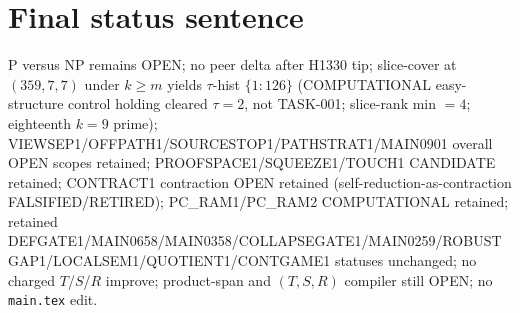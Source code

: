 \documentclass[11pt]{article}
\begin{document}
\section*{Final status sentence}
P versus NP remains OPEN; no peer delta after H1330 tip; slice-cover at $(359,7,7)$ under $k{\ge}m$ yields $\tau$-hist $\{1{:}126\}$ (COMPUTATIONAL easy-structure control holding cleared $\tau{=}2$, not TASK-001; slice-rank min $=4$; eighteenth $k{=}9$ prime); VIEWSEP1/OFFPATH1/SOURCESTOP1/PATHSTRAT1/MAIN0901 overall OPEN scopes retained; PROOFSPACE1/SQUEEZE1/TOUCH1 CANDIDATE retained; CONTRACT1 contraction OPEN retained (self-reduction-as-contraction FALSIFIED/RETIRED); PC\_RAM1/PC\_RAM2 COMPUTATIONAL retained; retained DEFGATE1/MAIN0658/MAIN0358/COLLAPSEGATE1/MAIN0259/ROBUSTGAP1/LOCALSEM1/QUOTIENT1/CONTGAME1 statuses unchanged; no charged $T$/$S$/$R$ improve; product-span and $(T,S,R)$ compiler still OPEN; no \texttt{main.tex} edit.
\end{document}
